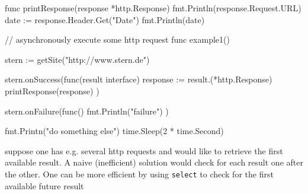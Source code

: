 \documentclass[landscape, a4paper]{article}
\begin{document}
\begin{minipage}[t]{0.2\linewidth}
\begin{betterlist}
{\begin{dnumberedcodebox}[minted language=go,minted options={autogobble, fontsize=\small}, box align=top]
            func printResponse(response *http.Response) {
                fmt.Println(response.Request.URL)
                date := response.Header.Get("Date")
                fmt.Println(date)
            }

            // asynchronously execute some http request
            func example1() {
                stern := getSite("http://www.stern.de")

                stern.onSuccess(func(result interface{}) {
                    response := result.(*http.Response)
                    printResponse(response)
                })

                stern.onFailure(func() {
                    fmt.Println("failure")
                })

                fmt.Printn("do something else")
                time.Sleep(2 * time.Second)
            }
                        \end{dnumberedcodebox}
		}

		\item {}
		\begin{betterlist}
			\item suppose one has e.g. several http requests and would like to retrieve the first available result. A naive (inefficient) solution would check for each result one after the other. One can be more efficient by using \verb|select| to check for the first available future result
		\end{betterlist}


\end{betterlist}
\end{minipage}
\end{document}
